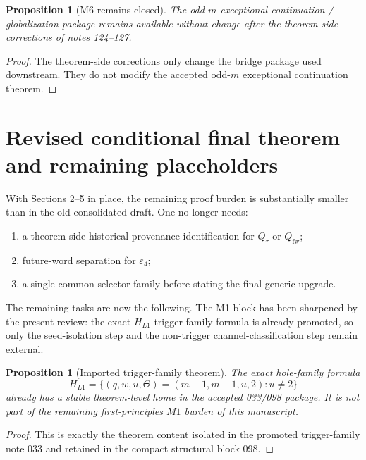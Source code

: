 \documentclass[11pt]{article}
\newtheorem{proposition}[theorem]{Proposition}
\newcommand{\eps}{\varepsilon}
\begin{document}
\begin{proposition}[M6 remains closed]
\label{prop:M6-closed}
The odd-$m$ exceptional continuation / globalization package remains available
without change after the theorem-side corrections of notes 124--127.
\end{proposition}

\begin{proof}
The theorem-side corrections only change the bridge package used downstream.
They do not modify the accepted odd-$m$ exceptional continuation theorem.
\end{proof}

\section{Revised conditional final theorem and remaining placeholders}

With Sections 2--5 in place, the remaining proof burden is substantially smaller
than in the old consolidated draft.
One no longer needs:
\begin{enumerate}[label=\textup{(\roman*)},leftmargin=2.5em]
\item a theorem-side historical provenance identification for $Q_{\tau}$ or
      $Q_{\mathrm{fw}}$;
\item future-word separation for $\eps_4$;
\item a single common selector family before stating the final generic upgrade.
\end{enumerate}

The remaining tasks are now the following.
The M1 block has been sharpened by the present review: the exact $H_{L1}$
trigger-family formula is already promoted, so only the seed-isolation step and
the non-trigger channel-classification step remain external.

\begin{proposition}[Imported trigger-family theorem]
\label{prop:imported-HL1-trigger}
The exact hole-family formula
\[
H_{L1}=
\{(q,w,u,\Theta)=(m-1,m-1,u,2): u\neq 2\}
\]
already has a stable theorem-level home in the accepted \textup{033}/\textup{098}
package. It is not part of the remaining first-principles $M1$ burden of this
manuscript.
\end{proposition}

\begin{proof}
This is exactly the theorem content isolated in the promoted trigger-family note
\textup{033} and retained in the compact structural block \textup{098}.
\end{proof}
\end{document}
